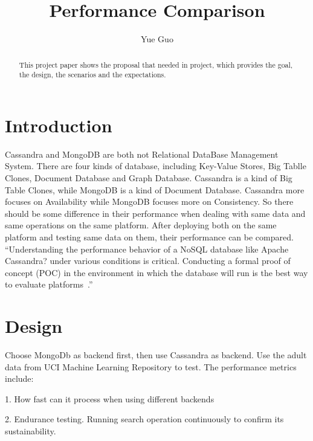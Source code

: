 
\title{Performance Comparison}

\author{Yue Guo}

\begin{abstract}
This project paper shows the proposal that needed in project, which 
provides the goal, the design, the scenarios and the expectations.
\end{abstract}



\maketitle


\section{Introduction}
Cassandra and MongoDB are both not Relational DataBase Management System. 
There are four kinds of database, including Key-Value Stores, Big Tablle 
Clones, Document Database and Graph Database. Cassandra is a kind of Big 
Table Clones, while MongoDB is a kind of Document Database. Cassandra more 
focuses on Availability while MongoDB focuses more on Consistency. So there
 should be some difference in their performance when dealing with same data 
 and same operations on the same platform. After deploying both on the same 
 platform and testing same data on them, their performance can be compared. 
 ``Understanding the performance behavior of a NoSQL database like Apache 
 Cassandra? under various conditions is critical. Conducting a formal proof 
 of concept (POC) in the environment in which the database will run is the 
 best way to evaluate platforms~\cite{hid-sp18-508-benchmarking}.''


\section{Design}
Choose MongoDb as backend first, then use Cassandra as backend. Use the adult
 data from UCI Machine Learning Repository to test. The performance metrics include: 

1. How fast can it process when using different backends

2. Endurance testing. Running search operation continuously to confirm its 
sustainability.

